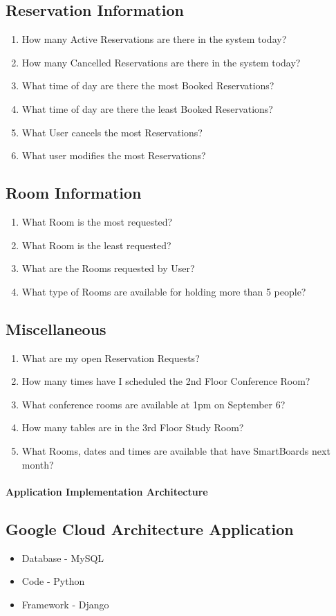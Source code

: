 \documentclass[11pt]{report}
\begin{document}
\subsection*{Reservation Information}
\begin{enumerate}
\item How many Active Reservations are there in the system today?
\item How many Cancelled Reservations are there in the system today?
\item What time of day are there the most Booked Reservations?
\item What time of day are there the least Booked Reservations?
\item What User cancels the most Reservations?
\item What user modifies the most Reservations?
\end{enumerate}

\subsection*{Room Information}
\begin{enumerate}
\item What Room is the most requested?
\item What Room is the least requested?
\item What are the Rooms requested by User?
\item What type of Rooms are available for holding more than 5 people?
\end{enumerate}

\subsection*{Miscellaneous}
\begin{enumerate}
\item What are my open Reservation Requests?
\item How many times have I scheduled the 2nd Floor Conference Room?
\item What conference rooms are available at 1pm on September 6?
\item How many tables are in the 3rd Floor Study Room?
\item What Rooms, dates and times are available that have SmartBoards next month?
\end{enumerate}

\paragraph{Application Implementation Architecture}
\subsection*{Google Cloud Architecture Application}
\begin{itemize}
    \item Database - MySQL
    \item Code - Python
    \item Framework - Django
\end{itemize}
\end{document}
